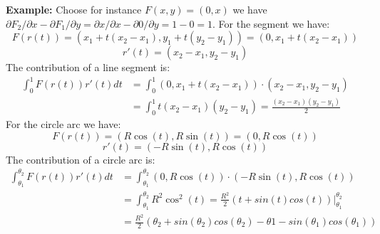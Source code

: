 \textbf{Example:} Choose for instance $F(x, y) = (0, x)$ we have $\partial F_2 \slash \partial x - \partial F_1 \slash \partial y = 
\partial x \slash \partial x - \partial 0 \slash \partial y = 1 - 0 = 1$. For the segment we have:
$$
F(r(t)) = (x_1 + t(x_2 - x_1), y_1 + t(y_2 - y_1)) = (0, x_1 + t(x_2 - x_1))
$$
$$
r'(t) = (x_2 - x_1, y_2 - y_1)
$$
The contribution of a line segment is:
\footnotesize
\begin{align*}
\int_0^1 F(r(t)) r'(t) dt & = \int_0^1 (0, x_1 + t(x_2 - x_1)) \cdot (x_2 - x_1, y_2 - y_1) \\
& = \int_0^1 t (x_2 - x_1) (y_2 - y_1) = \frac{(x_2 - x_1) (y_2 - y_1)}{2}
\end{align*}
\normalsize
For the circle arc we have:
$$
F(r(t)) = (R \cos(t), R \sin(t)) = (0, R \cos(t))
$$
$$
r'(t) = (-R \sin(t), R \cos(t))
$$
The contribution of a circle arc is:
\footnotesize
\begin{align*}
\int_{\theta_1}^{\theta_2} F(r(t)) r'(t) dt & = \int_{\theta_1}^{\theta_2} (0, R \cos(t)) \cdot (-R \sin(t), R \cos(t)) \\
& = \int_{\theta_1}^{\theta_2} R^2 \cos^2(t) = \frac{R^2}{2} \left( t + sin(t) cos(t) \right) \Big|_{\theta_1}^{\theta_2}  \\
& = \frac{R^2}{2} \left( \theta_2 + sin(\theta_2) cos(\theta_2) - \theta1 - sin(\theta_1) cos(\theta_1) \right)
\end{align*}
\begin{center}
\end{center}


